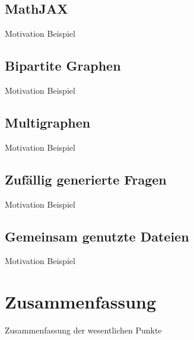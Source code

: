 \section{MathJAX}
Motivation
Beispiel

\section{Bipartite Graphen}
Motivation
Beispiel

\section{Multigraphen}
Motivation
Beispiel

\section{Zufällig generierte Fragen}
Motivation
Beispiel

\section{Gemeinsam genutzte Dateien}
Motivation
Beispiel

\chapter{Zusammenfassung}
Zusammenfassung der wesentlichen Punkte